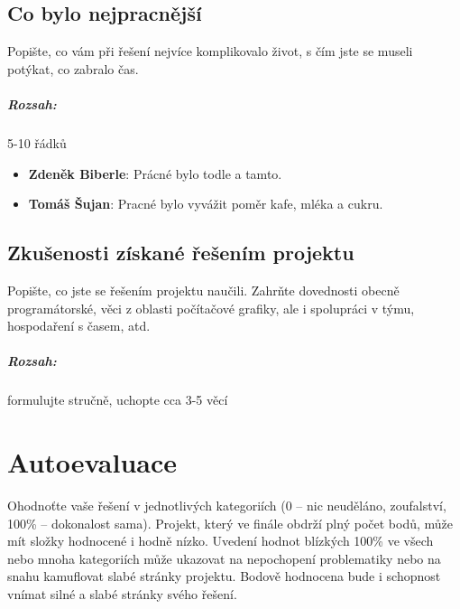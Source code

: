 \documentclass[12pt,a4paper,titlepage,final]{report}
\newcommand\AuthorA{Zdeněk Biberle}
\newcommand\AuthorB{Tomáš Šujan}
\begin{document}
\section{Co bylo nejpracnější}

Popište, co vám při řešení nejvíce komplikovalo život, s čím jste se museli
potýkat, co zabralo čas.

\paragraph{Rozsah:} 5-10 řádků

\begin{itemize}
\item \textbf{\AuthorA}: Prácné bylo todle a tamto.
\item \textbf{\AuthorB}: Pracné bylo vyvážit poměr kafe, mléka a cukru. 
\end{itemize}


\section{Zkušenosti získané řešením projektu}

Popište, co jste se řešením projektu naučili. Zahrňte dovednosti obecně
programátorské, věci z oblasti počítačové grafiky, ale i spolupráci v týmu,
hospodaření s časem, atd.

\paragraph{Rozsah:} formulujte stručně, uchopte cca 3-5 věcí

\chapter{Autoevaluace}

Ohodnoťte vaše řešení v jednotlivých kategoriích (0 – nic neuděláno,
zoufalství, 100\% – dokonalost sama). Projekt, který ve finále obdrží plný
počet bodů, může mít složky hodnocené i hodně nízko. Uvedení hodnot blízkých
100\% ve všech nebo mnoha kategoriích může ukazovat na nepochopení problematiky nebo na snahu kamuflovat slabé stránky projektu. Bodově hodnocena bude i
schopnost vnímat silné a slabé stránky svého řešení.
\end{document}
